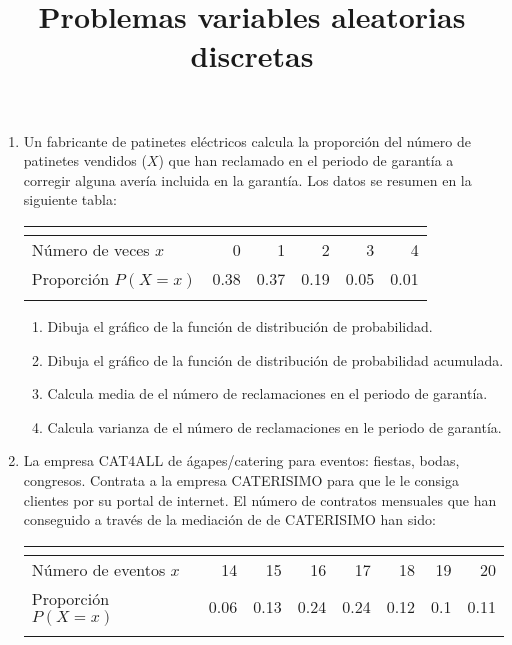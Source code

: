 \documentclass[
]{article}
\title{Problemas variables aleatorias discretas}
\author{}
\date{\vspace{-2.5em}}
\providecommand{\tightlist}{%
  \setlength{\itemsep}{0pt}\setlength{\parskip}{0pt}}
\begin{document}
\maketitle

\begin{enumerate}
\def\labelenumi{\arabic{enumi}.}
\item
  Un fabricante de patinetes eléctricos calcula la proporción del número
  de patinetes vendidos (\(X\)) que han reclamado en el periodo de
  garantía a corregir alguna avería incluida en la garantía. Los datos
  se resumen en la siguiente tabla:

  \begin{center}
  \begin{tabular}{|l||r|r|r|r|r|}
  \multicolumn{6}{c}{\vphantom{R}}\\
  \hline
  Número de veces $x$    & 0    & 1    &  2   &  3   &  4 \\
  \hline
  Proporción    $P(X=x)$ & 0.38 & 0.37 & 0.19 & 0.05 & 0.01
  \\\hline \multicolumn{6}{c}{\vphantom{R}}
  \end{tabular}
  \end{center}

  \begin{enumerate}
  \def\labelenumii{\alph{enumii}.}
  \tightlist
  \item
    Dibuja el gráfico de la función de distribución de probabilidad.
  \item
    Dibuja el gráfico de la función de distribución de probabilidad
    acumulada.
  \item
    Calcula media de el número de reclamaciones en el periodo de
    garantía.
  \item
    Calcula varianza de el número de reclamaciones en le periodo de
    garantía.
  \end{enumerate}
\item
  La empresa CAT4ALL de ágapes/catering para eventos: fiestas, bodas,
  congresos. Contrata a la empresa CATERISIMO para que le le consiga
  clientes por su portal de internet. El número de contratos mensuales
  que han conseguido a través de la mediación de de CATERISIMO han sido:

  \begin{center}
  \begin{tabular}{|l||r|r|r|r|r|r|r|}
  \multicolumn{8}{c}{\vphantom{R}}\\
  \hline
  Número de eventos $x$ & 14  & 15  &  16 &  17 &  18 & 19 & 20 \\
  \hline
  Proporción  $P(X=x)$      & 0.06&0.13 &0.24 &0.24 &0.12 &0.1 &0.11
  \\\hline \multicolumn{8}{c}{\vphantom{R}}
  \end{tabular}
  \end{center}


\end{enumerate}
\end{document}
